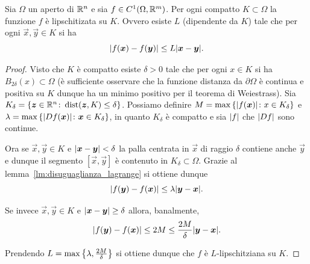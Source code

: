\begin{lemma}
  \label{lm:lipschitz_C1}
  Sia $\Omega$ un aperto di ${\mathbb R}^n$ e sia $f\in C^1(\Omega,{\mathbb R}^m)$.
  Per ogni compatto $K\subset \Omega$ 
  la funzione $f$ è lipschitizata su $K$.
  Ovvero esiste $L$ (dipendente da $K$)
  tale che
  per ogni $\vec x,\vec y \in K$ si ha
  \[
    {\left|f(\boldsymbol x) - f(\boldsymbol y)\right|} \le L {\left|\boldsymbol x - \boldsymbol y\right|}.
  \]
\end{lemma}
%
\begin{proof}
Visto che $K$ è compatto esiste $\delta>0$ 
tale che per ogni $x\in K$ si ha $B_{2\delta}(x)\subset \Omega$
(è sufficiente osservare che 
la funzione distanza da $\partial \Omega$ è continua e positiva su $K$
dunque ha un minimo positivo per il teorema di Weiestrass).
Sia $K_\delta = {\left\{ \boldsymbol z\in {\mathbb R}^n\colon \operatorname{dist}(\boldsymbol z, K) \le \delta \right\}}$.
Possiamo definire $M = \max{\left\{ {\left|f(\boldsymbol x)\right|}\colon x \in K_{\delta} \right\}}$
e $\lambda = \max{\left\{ {\left|Df(\boldsymbol x)\right|}\colon \boldsymbol x \in K_{\delta} \right\}}$,
in quanto $K_\delta$ è compatto e sia ${\left|f\right|}$ che ${\left|Df\right|}$ sono continue.

Ora se $\vec x,\vec y \in K$ e ${\left|\boldsymbol x - \boldsymbol y\right|} < \delta$
la palla centrata in $\vec x$ di raggio $\delta$ contiene anche $\vec y$ e dunque
il segmento $[\vec x, \vec y]$ è contenuto in $K_\delta\subset \Omega$.
Grazie al lemma~\ref{lm:disuguaglianza_lagrange} si ottiene dunque 
\[
  {\left|f(\boldsymbol y) - f(\boldsymbol x)\right|} \le \lambda {\left|\boldsymbol y - \boldsymbol x\right|}.
\]

Se invece $\vec x,\vec y \in K$ e ${\left|\boldsymbol x - \boldsymbol y\right|} \ge \delta$ allora,
banalmente,
\[
{\left|f(\boldsymbol y)-f(\boldsymbol x)\right|}
\le 2 M 
\le \frac{2M}{\delta}{\left|\boldsymbol y - \boldsymbol x\right|}.
\]

Prendendo $L = \max{\left\{ \lambda, \frac{2M}{\delta} \right\}}$ 
si ottiene dunque che $f$ è $L$-lipschitziana 
su $K$.
\end{proof}

